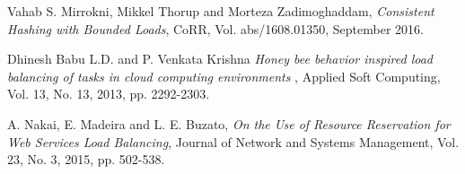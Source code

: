 \begin{thebibliography}{1}
Vahab S. Mirrokni, Mikkel Thorup and Morteza Zadimoghaddam,
  \emph{Consistent Hashing with Bounded Loads},
  CoRR,
  Vol. abs/1608.01350, September 2016.

  Dhinesh Babu L.D. and P. Venkata Krishna
  \emph{Honey bee behavior inspired load balancing of tasks in cloud computing environments },
  Applied Soft Computing,
  Vol. 13, No. 13, 2013, pp. 2292-2303.

  A. Nakai, E. Madeira and L. E. Buzato,
  \emph{On the Use of Resource Reservation for Web Services Load Balancing},
  Journal of Network and Systems Management,
  Vol. 23, No. 3, 2015, pp. 502-538.

\end{thebibliography}
